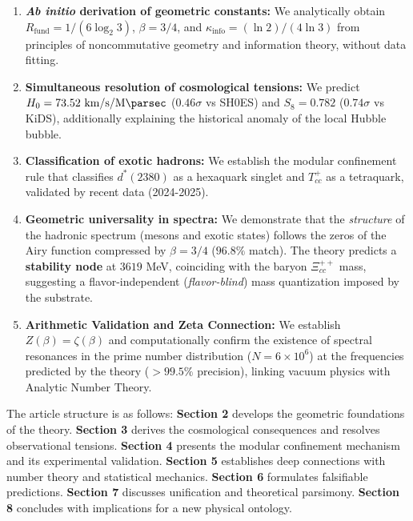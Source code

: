 \documentclass[11pt, a4paper]{article}
\theoremstyle{plain}
\theoremstyle{definition}
\newcommand{\Rfactor}{R_{\text{fund}}}
\newcommand{\Kinfo}{\kappa_{\text{info}}}
\begin{document}
\begin{enumerate}
    \item \textbf{\textit{Ab initio} derivation of geometric constants:} We analytically obtain $\Rfactor = 1/(6\log_2 3)$, $\beta = 3/4$, and $\Kinfo = (\ln 2)/(4\ln 3)$ from principles of noncommutative geometry and information theory, without data fitting.
    
    \item \textbf{Simultaneous resolution of cosmological tensions:} We predict $H_0 = 73.52\ \si{\kilo\meter\per\second\per\mega\parsec}$ ($0.46\sigma$ vs SH0ES) and $S_8 = 0.782$ ($0.74\sigma$ vs KiDS), additionally explaining the historical anomaly of the local Hubble bubble.
    
    \item \textbf{Classification of exotic hadrons:} We establish the modular confinement rule that classifies $d^*(2380)$ as a hexaquark singlet and $T_{cc}^+$ as a tetraquark, validated by recent data (2024-2025).
    
    \item \textbf{Geometric universality in spectra:} We demonstrate that the \textit{structure} of the hadronic spectrum (mesons and exotic states) follows the zeros of the Airy function compressed by $\beta = 3/4$ ($96.8\%$ match). The theory predicts a \textbf{stability node} at $3619$ MeV, coinciding with the baryon $\Xi_{cc}^{++}$ mass, suggesting a flavor-independent (\textit{flavor-blind}) mass quantization imposed by the substrate.
    
    \item \textbf{Arithmetic Validation and Zeta Connection:} We establish $Z(\beta) = \zeta(\beta)$ and computationally confirm the existence of spectral resonances in the prime number distribution ($N=6\times 10^6$) at the frequencies predicted by the theory ($>99.5\%$ precision), linking vacuum physics with Analytic Number Theory.
\end{enumerate}

The article structure is as follows: \textbf{Section 2} develops the geometric foundations of the theory. \textbf{Section 3} derives the cosmological consequences and resolves observational tensions. \textbf{Section 4} presents the modular confinement mechanism and its experimental validation. \textbf{Section 5} establishes deep connections with number theory and statistical mechanics. \textbf{Section 6} formulates falsifiable predictions. \textbf{Section 7} discusses unification and theoretical parsimony. \textbf{Section 8} concludes with implications for a new physical ontology.
\end{document}
